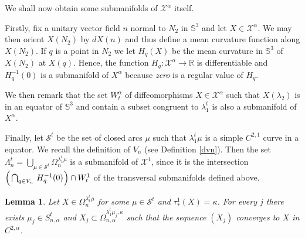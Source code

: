 \documentclass{article}
\def\S3{{\mathbb S^3}}
\newtheorem{lemma}{Lemma}[section]
\begin{document}
We shall now obtain some submanifolds of $\mathcal X^\alpha$ itself.

Firstly, fix a unitary vector field $n$ normal to $N_2$ in $\S3$ and let $X\in \mathcal X^\alpha$. We may then orient $X(N_2)$ by $dX(n)$ and thus define a mean curvature function along $X(N_2)$.
If $q$ is a point in $N_2$ we let $H_q(X)$ be the mean curvature in $\S3$ of $X(N_2)$ at $X(q)$. Hence, the function $H_q: \mathcal X^\alpha\to \mathbb R$ is differentiable and $H_q^{-1}(0)$ is a submanifold of $X^\alpha$ because {\it zero} is a regular value of $H_q$.

We then remark that the set $W_t^\alpha$ of diffeomorphisms $X\in \mathcal X^\alpha$ such that $X(\lambda_2)$ is in an equator of $\S3$ and  contain a subset congruent to $\lambda_1^t$ is also a submanifold of $X^\alpha$.

Finally, let $\mathcal S^t$ be the set of closed arcs $\mu$ such that $\lambda_1^t\mu$ is a simple $C^{2,1}$ curve in a equator. We recall the definition of $V_n$ (see Definition \ref{dvn}).
Then the set $\Lambda_n^t=\bigcup_{\mu\in\mathcal S^t}\Omega_n^{\lambda_1^t\mu}$   is a submanifold of $\mathcal X^1$, since it is the intersection $\left(\hspace{.02in}\bigcap_{q\in V_n}\hspace{.02in}
 H_{q}^{-1}(0)\hspace{.01in}\right)\cap W_t^1$ of the transversal submanifolds defined above. 


 


 
\begin{lemma}\label{laux} Let $X\in\Omega_n^{\lambda_1^t\mu}$ for some $\mu\in \mathcal S^t$ and $\tau_*^1(X)=\kappa$. For every $j$ there exists   $\mu_j\in S^t_{n,\alpha}$ and $X_j\subset\Omega_{n,\alpha}^{\lambda_1^t\mu_j,\kappa}$ such that the sequence $(X_j)$ converges to $X$ in $C^{2,\alpha}$.
\end{lemma} 
\end{document}
